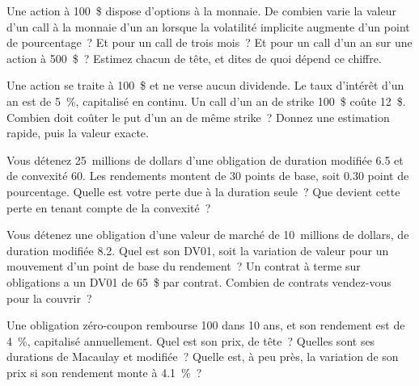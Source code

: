 \begin{question}\label{iq:iv2:options-and-bond-arithmetic-at-speed:4}
Une action à 100~\$ dispose d'options à la monnaie. De combien varie la valeur d'un call à la monnaie d'un an lorsque la volatilité implicite augmente d'un point de pourcentage~? Et pour un call de trois mois~? Et pour un call d'un an sur une action à 500~\$~? Estimez chacun de tête, et dites de quoi dépend ce chiffre.
\end{question}

\begin{question}\label{iq:iv2:options-and-bond-arithmetic-at-speed:5}
Une action se traite à 100~\$ et ne verse aucun dividende. Le taux d'intérêt d'un an est de 5~\%, capitalisé en continu. Un call d'un an de strike 100~\$ coûte 12~\$. Combien doit coûter le put d'un an de même strike~? Donnez une estimation rapide, puis la valeur exacte.
\end{question}

\begin{question}\label{iq:iv2:options-and-bond-arithmetic-at-speed:6}
Vous détenez 25~millions de dollars d'une obligation de duration modifiée 6.5 et de convexité 60. Les rendements montent de 30 points de base, soit 0.30 point de pourcentage. Quelle est votre perte due à la duration seule~? Que devient cette perte en tenant compte de la convexité~?
\end{question}

\begin{question}\label{iq:iv2:options-and-bond-arithmetic-at-speed:7}
Vous détenez une obligation d'une valeur de marché de 10~millions de dollars, de duration modifiée 8.2. Quel est son DV01, soit la variation de valeur pour un mouvement d'un point de base du rendement~? Un contrat à terme sur obligations a un DV01 de 65~\$ par contrat. Combien de contrats vendez-vous pour la couvrir~?
\end{question}

\begin{question}\label{iq:iv2:options-and-bond-arithmetic-at-speed:8}
Une obligation zéro-coupon rembourse 100 dans 10 ans, et son rendement est de 4~\%, capitalisé annuellement. Quel est son prix, de tête~? Quelles sont ses durations de Macaulay et modifiée~? Quelle est, à peu près, la variation de son prix si son rendement monte à 4.1~\%~?
\end{question}

